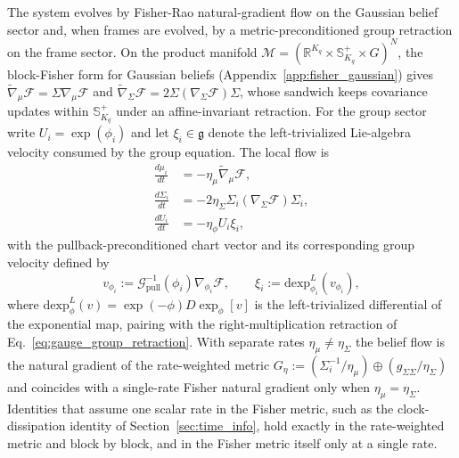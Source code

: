The system evolves by Fisher-Rao natural-gradient flow on the Gaussian belief sector and, when frames are evolved, by a metric-preconditioned group retraction on the frame sector. On the product manifold $\mathcal{M} = (\mathbb{R}^{K_q} \times \mathbb{S}^+_{K_q} \times G)^N$, the block-Fisher form for Gaussian beliefs (Appendix~\ref{app:fisher_gaussian}) gives $\tilde\nabla_\mu\mathcal{F} = \Sigma\nabla_\mu\mathcal{F}$ and $\tilde\nabla_\Sigma\mathcal{F} = 2\Sigma(\nabla_\Sigma\mathcal{F})\Sigma$, whose sandwich keeps covariance updates within $\mathbb{S}^+_{K_q}$ under an affine-invariant retraction. For the group sector write $U_i = \exp(\phi_i)$ and let $\xi_i \in \mathfrak{g}$ denote the left-trivialized Lie-algebra velocity consumed by the group equation. The local flow is
\begin{align}
\frac{d\mu_i}{dt} &= -\eta_\mu \tilde{\nabla}_\mu \mathcal{F}, \\
\frac{d\Sigma_i}{dt} &= -2\eta_\Sigma \Sigma_i (\nabla_\Sigma \mathcal{F}) \Sigma_i, \\
\frac{dU_i}{dt} &= -\eta_\phi U_i \xi_i,
\label{eq:gauge_natural_gradient}
\end{align}
with the pullback-preconditioned chart vector and its corresponding group velocity defined by
\begin{equation}
v_{\phi_i} := \mathcal{G}_{\mathrm{pull}}^{-1}(\phi_i) \nabla_{\phi_i} \mathcal{F},
\qquad
\xi_i := \mathrm{dexp}_{\phi_i}^{L}(v_{\phi_i}),
\label{eq:gauge_natural_gradient_def}
\end{equation}
where $\mathrm{dexp}_{\phi}^{L}(v) = \exp(-\phi)D\exp_{\phi}[v]$ is the left-trivialized differential of the exponential map, pairing with the right-multiplication retraction of Eq.~\eqref{eq:gauge_group_retraction}. With separate rates $\eta_\mu \neq \eta_\Sigma$ the belief flow is the natural gradient of the rate-weighted metric $G_\eta := (\Sigma_i^{-1}/\eta_\mu) \oplus (g_{\Sigma\Sigma}/\eta_\Sigma)$ and coincides with a single-rate Fisher natural gradient only when $\eta_\mu = \eta_\Sigma$. Identities that assume one scalar rate in the Fisher metric, such as the clock-dissipation identity of Section~\ref{sec:time_info}, hold exactly in the rate-weighted metric and block by block, and in the Fisher metric itself only at a single rate.

